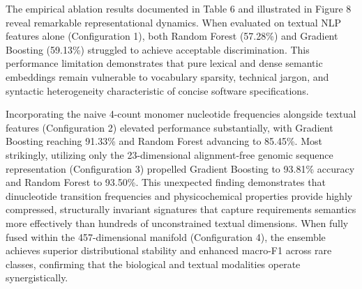 The empirical ablation results documented in Table 6 and illustrated in Figure 8 reveal remarkable representational dynamics. When evaluated on textual NLP features alone (Configuration 1), both Random Forest (57.28\%) and Gradient Boosting (59.13\%) struggled to achieve acceptable discrimination. This performance limitation demonstrates that pure lexical and dense semantic embeddings remain vulnerable to vocabulary sparsity, technical jargon, and syntactic heterogeneity characteristic of concise software specifications.

\begin{table}[htbp]
\centering
\caption{Systematic feature ablation across biological~\cite{ref6,ref7}, lexical, and dense semantic representations~\cite{ref11}.}
\label{tab:ablation_study}
\small
{}
\end{table}

Incorporating the naive 4-count monomer nucleotide frequencies alongside textual features (Configuration 2) elevated performance substantially, with Gradient Boosting reaching 91.33\% and Random Forest advancing to 85.45\%. Most strikingly, utilizing only the 23-dimensional alignment-free genomic sequence representation (Configuration 3) propelled Gradient Boosting to 93.81\% accuracy and Random Forest to 93.50\%. This unexpected finding demonstrates that dinucleotide transition frequencies and physicochemical properties provide highly compressed, structurally invariant signatures that capture requirements semantics more effectively than hundreds of unconstrained textual dimensions. When fully fused within the 457-dimensional manifold (Configuration 4), the ensemble achieves superior distributional stability and enhanced macro-F1 across rare classes, confirming that the biological and textual modalities operate synergistically.

